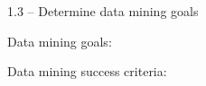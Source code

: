 \documentclass{article}
\begin{document}
1.3 – Determine data mining goals

Data mining goals:

Data mining success criteria:



\end{document}
